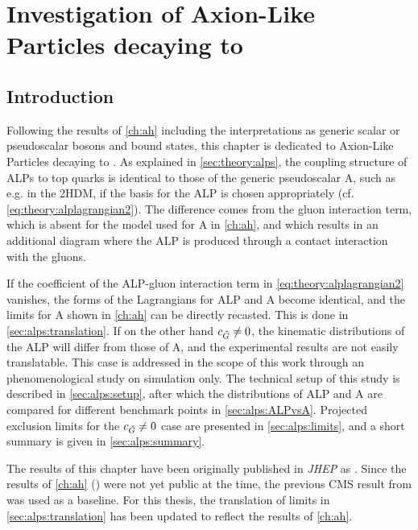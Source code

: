 \chapter{Investigation of Axion-Like Particles decaying to \ttbartitle}
\label{ch:alps}

\section{Introduction}

Following the results of \cref{ch:ah} including the interpretations as generic scalar or pseudoscalar bosons and \ttbar bound states, this chapter is dedicated to Axion-Like Particles decaying to \ttbar. As explained in \cref{sec:theory:alps}, the coupling structure of ALPs to top quarks is identical to those of the generic pseudoscalar A, such as e.g. in the 2HDM, if the basis for the ALP is chosen appropriately (cf. \cref{eq:theory:alplagrangian2}). The difference comes from the gluon interaction term, which is absent for the model used for A in \cref{ch:ah}, and which results in an additional diagram where the ALP is produced through a contact interaction with the gluons. 

If the coefficient \cG of the ALP-gluon interaction term in \cref{eq:theory:alplagrangian2} vanishes, the forms of the Lagrangians for ALP and A become identical, and the limits for A shown in \cref{ch:ah} can be directly recasted. This is done in \cref{sec:alps:translation}. If on the other hand $c_{\tilde{G}} \neq 0$, the kinematic distributions of the ALP will differ from those of A, and the experimental results are not easily translatable. This case is addressed in the scope of this work through an phenomenological study on simulation only. The technical setup of this study is described in \cref{sec:alps:setup}, after which the distributions of ALP and A are compared for different benchmark points in \cref{sec:alps:ALPvsA}. Projected exclusion limits for the $c_{\tilde{G}} \neq 0$ case are presented in \cref{sec:alps:limits}, and a short summary is given in \cref{sec:alps:summary}.

The results of this chapter have been originally published in \textit{JHEP} as . Since the results of \cref{ch:ah} () were not yet public at the time, the previous CMS result from  was used as a baseline. For this thesis, the translation of limits in \cref{sec:alps:translation} has been updated to reflect the results of \cref{ch:ah}.

